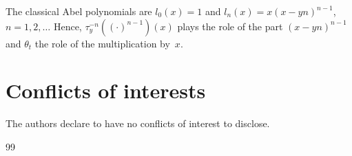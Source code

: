 \documentclass[11pt]{article}
\theoremstyle{plain}
\theoremstyle{remark}
\numberwithin{equation}{section} %
\begin{document}
The classical Abel polynomials are $l_0(x) = 1$ and $l_n(x) = x(x-yn)^{n-1}$, $n=1,2,\dots$ Hence, $\tau_y^{-n}((\cdot)^{n-1})(x)$ plays the role of the part $(x-yn)^{n-1}$ and $\theta_t$ the role of the multiplication by~$x$.

\section*{Conflicts of interests}
The authors declare to have no conflicts of interest to disclose.

\begin{thebibliography}{99}











\end{thebibliography}
\end{document}
